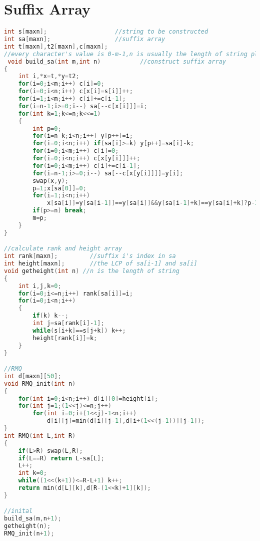  \section{Suffix Array}
 \begin{lstlisting}[language=C++]
int s[maxn];                   //string to be constructed
int sa[maxn];                  //suffix array
int t[maxn],t2[maxn],c[maxn];
//every character's value is 0-m-1,n is usually the length of string plus 1
 void build_sa(int m,int n)           //construct suffix array
{
    int i,*x=t,*y=t2;
    for(i=0;i<m;i++) c[i]=0;
    for(i=0;i<n;i++) c[x[i]=s[i]]++;
    for(i=1;i<m;i++) c[i]+=c[i-1];
    for(i=n-1;i>=0;i--) sa[--c[x[i]]]=i;
    for(int k=1;k<=n;k<<=1)
    {
        int p=0;
        for(i=n-k;i<n;i++) y[p++]=i;
        for(i=0;i<n;i++) if(sa[i]>=k) y[p++]=sa[i]-k;
        for(i=0;i<m;i++) c[i]=0;
        for(i=0;i<n;i++) c[x[y[i]]]++;
        for(i=0;i<m;i++) c[i]+=c[i-1];
        for(i=n-1;i>=0;i--) sa[--c[x[y[i]]]]=y[i];
        swap(x,y);
        p=1;x[sa[0]]=0;
        for(i=1;i<n;i++)
            x[sa[i]]=y[sa[i-1]]==y[sa[i]]&&y[sa[i-1]+k]==y[sa[i]+k]?p-1:p++;
        if(p>=n) break;
        m=p;
    }
}

//calculate rank and height array
int rank[maxn];         //suffix i's index in sa
int height[maxn];       //the LCP of sa[i-1] and sa[i]
void getheight(int n) //n is the length of string
{
    int i,j,k=0;
    for(i=0;i<=n;i++) rank[sa[i]]=i;
    for(i=0;i<n;i++)
    {
        if(k) k--;
        int j=sa[rank[i]-1];
        while(s[i+k]==s[j+k]) k++;
        height[rank[i]]=k;
    }
}

//RMQ
int d[maxn][50];
void RMQ_init(int n)
{
    for(int i=0;i<n;i++) d[i][0]=height[i];
    for(int j=1;(1<<j)<=n;j++)
        for(int i=0;i+(1<<j)-1<n;i++)
            d[i][j]=min(d[i][j-1],d[i+(1<<(j-1))][j-1]);
}
int RMQ(int L,int R)
{
    if(L>R) swap(L,R);
    if(L==R) return L-sa[L];
    L++;
    int k=0;
    while((1<<(k+1))<=R-L+1) k++;
    return min(d[L][k],d[R-(1<<k)+1][k]);
}

//inital
build_sa(m,n+1);
getheight(n);
RMQ_init(n+1);
 \end{lstlisting}

